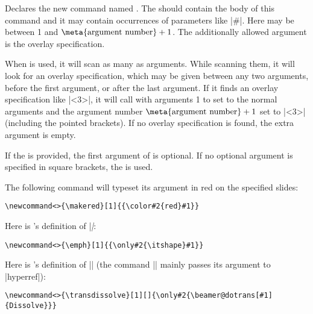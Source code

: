 \begin{command}{\newcommand\declare{|<>|}}
  Declares the new command named . The  should contain the body of this command and it may contain occurrences of parameters like |#|. Here  may be between 1 and $\mbox{\meta{argument number}}+1$. The additionally allowed argument is the overlay specification.

  When  is used, it will scan as many as  arguments. While scanning them, it will look for an overlay specification, which may be given between any two arguments, before the first argument, or after the last argument. If it finds an overlay specification like |<3>|, it will call  with arguments 1 to  set to the normal arguments and the argument number $\mbox{\meta{argument number}}+1$ set to |<3>| (including the pointed brackets). If no overlay specification is found, the extra argument is empty.

  If the  is provided, the first argument of  is optional. If no optional argument is specified in square brackets, the  is used.

  \example
  The following command will typeset its argument in red on the specified slides:
\begin{verbatim}
\newcommand<>{\makered}[1]{{\color#2{red}#1}}
\end{verbatim}

  \example
  Here is \beamer's definition of |\emph|:
\begin{verbatim}
\newcommand<>{\emph}[1]{{\only#2{\itshape}#1}}
\end{verbatim}

  \example
  Here is \beamer's definition of |\transdissolve| (the command |\beamer@dotrans| mainly passes its argument to |hyperref|):
\begin{verbatim}
\newcommand<>{\transdissolve}[1][]{\only#2{\beamer@dotrans[#1]{Dissolve}}}
\end{verbatim}
\end{command}


